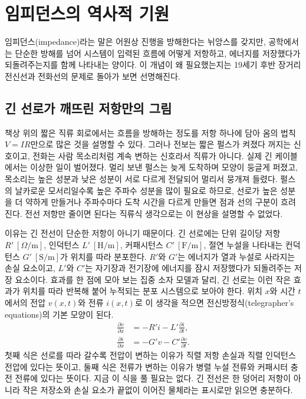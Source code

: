 \section{임피던스의 역사적 기원}\label{sec:u3-history}

임피던스(impedance)라는 말은 어원상 진행을 방해한다는 뉘앙스를 갖지만,
공학에서는 단순한 방해를 넘어 시스템이 입력된 흐름에 어떻게 저항하고,
에너지를 저장했다가 되돌려주는지를 함께 나타내는 양이다.
이 개념이 왜 필요했는지는 19세기 후반 장거리 전신선과 전화선의 문제로
돌아가 보면 선명해진다.

\subsection{긴 선로가 깨뜨린 저항만의 그림}

책상 위의 짧은 직류 회로에서는 흐름을 방해하는 정도를 저항 하나에 담아
옴의 법칙 $V=IR$만으로 많은 것을 설명할 수 있다.
그러나 전보는 짧은 펄스가 켜졌다 꺼지는 신호이고, 전화는 사람 목소리처럼
계속 변하는 신호라서 직류가 아니다.
실제 긴 케이블에서는 이상한 일이 벌어졌다.
멀리 보낸 펄스는 늦게 도착하며 모양이 둥글게 퍼졌고, 목소리는 높은 성분과
낮은 성분이 서로 다르게 전달되어 멀리서 뭉개져 들렸다.
펄스의 날카로운 모서리일수록 높은 주파수 성분을 많이 필요로 하므로, 선로가
높은 성분을 더 약하게 만들거나 주파수마다 도착 시간을 다르게 만들면 점과
선의 구분이 흐려진다.
전선 저항만 줄이면 된다는 직류식 생각으로는 이 현상을 설명할 수 없었다.

이유는 긴 전선이 단순한 저항이 아니기 때문이다.
긴 선로에는 단위 길이당 저항 $R'~[\Omega/\mathrm{m}]$, 인덕턴스
$L'~[\mathrm{H/m}]$, 커패시턴스 $C'~[\mathrm{F/m}]$, 절연 누설을 나타내는
컨덕턴스 $G'~[\mathrm{S/m}]$가 위치를 따라 분포한다.
$R'$와 $G'$는 에너지가 열과 누설로 사라지는 손실 요소이고, $L'$와 $C'$는
자기장과 전기장에 에너지를 잠시 저장했다가 되돌려주는 저장 요소이다.
효과를 한 점에 모아 보는 집중 소자 모델과 달리, 긴 선로는 이런 작은
효과가 위치를 따라 반복해 붙어 누적되는 분포 시스템으로 보아야 한다.
위치 $x$와 시간 $t$에서의 전압 $v(x,t)$와 전류 $i(x,t)$로 이 생각을 적으면
전신방정식(telegrapher's equations)의 기본 모양이 된다.
\begin{align}
  \frac{\partial v}{\partial x} &= -R'i - L'\frac{\partial i}{\partial t}, \\
  \frac{\partial i}{\partial x} &= -G'v - C'\frac{\partial v}{\partial t}.
\end{align}
첫째 식은 선로를 따라 갈수록 전압이 변하는 이유가 직렬 저항 손실과 직렬
인덕턴스 전압에 있다는 뜻이고, 둘째 식은 전류가 변하는 이유가 병렬 누설
전류와 커패시터 충전 전류에 있다는 뜻이다.
지금 이 식을 풀 필요는 없다.
긴 전선은 한 덩어리 저항이 아니라 작은 저장소와 손실 요소가 끝없이 이어진
물체라는 표시로만 읽으면 충분하다.

